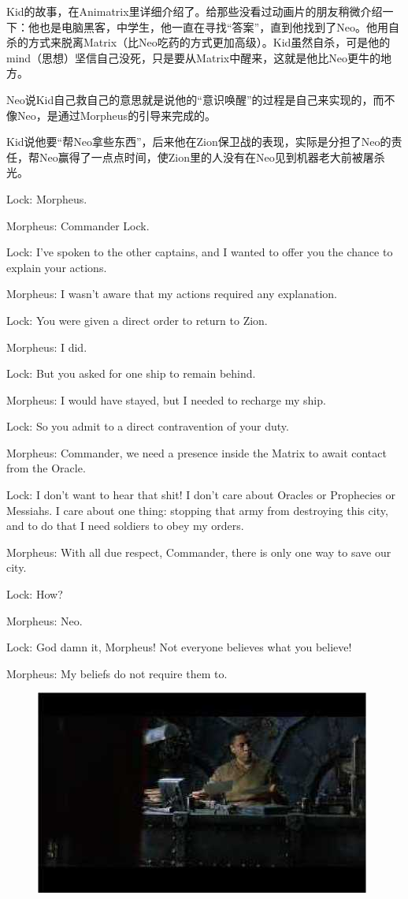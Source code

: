 \documentclass{ctexart}
\newenvironment{myquote}{\color{green} \setlength{\leftskip}{6em} \setlength{\rightskip}{4em} \setlength{\parindent}{-2em}}{\par}
\begin{document}
Kid的故事，在Animatrix里详细介绍了。给那些没看过动画片的朋友稍微介绍一下：他也是电脑黑客，中学生，他一直在寻找“答案”，直到他找到了Neo。他用自杀的方式来脱离Matrix（比Neo吃药的方式更加高级）。Kid虽然自杀，可是他的mind（思想）坚信自己没死，只是要从Matrix中醒来，这就是他比Neo更牛的地方。

Neo说Kid自己救自己的意思就是说他的“意识唤醒”的过程是自己来实现的，而不像Neo，是通过Morpheus的引导来完成的。

Kid说他要“帮Neo拿些东西”，后来他在Zion保卫战的表现，实际是分担了Neo的责任，帮Neo赢得了一点点时间，使Zion里的人没有在Neo见到机器老大前被屠杀光。

\begin{myquote}
Lock: Morpheus.

Morpheus: Commander Lock.

Lock: I've spoken to the other captains, and I wanted to offer you the chance to explain your actions.

Morpheus: I wasn't aware that my actions required any explanation.

Lock: You were given a direct order to return to Zion.

Morpheus: I did.

Lock: But you asked for one ship to remain behind.

Morpheus: I would have stayed, but I needed to recharge my ship.

Lock: So you admit to a direct contravention of your duty.

Morpheus: Commander, we need a presence inside the Matrix to await contact from the Oracle.

Lock: I don't want to hear that shit! I don't care about Oracles or Prophecies or Messiahs. I care about one thing: stopping that army from destroying this city, and to do that I need soldiers to obey my orders.

Morpheus: With all due respect, Commander, there is only one way to save our city.

Lock: How?

Morpheus: Neo.

Lock: God damn it, Morpheus! Not everyone believes what you believe!

Morpheus: My beliefs do not require them to.
\end{myquote}

\begin{figure}[htb]
\centering
\includegraphics[width=0.5\linewidth]{fig/read_reloaded-36}
\end{figure}
\end{document}
